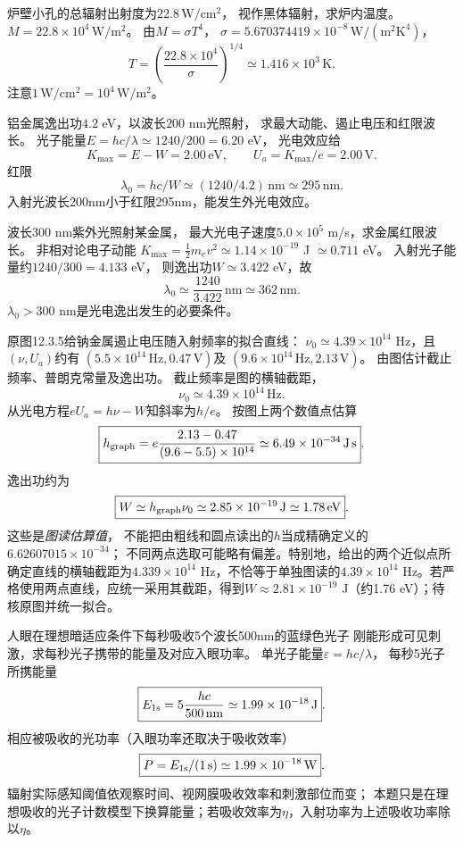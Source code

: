 \problemtext 炉壁小孔的总辐射出射度为$22.8\,\mathrm{W/cm^2}$，
视作黑体辐射，求炉内温度。
\workings
$M=22.8\times10^4\,\mathrm{W/m^2}$。
由$M=\sigma T^4$，
$\sigma=5.670374419\times10^{-8}\,\mathrm{W/(m^2K^4)}$，
\[
\boxed{T=\left(\frac{22.8\times10^4}{\sigma}\right)^{1/4}
\simeq1.416\times10^3\,\mathrm K}.
\]
\crosscheck 注意$1\,\mathrm{W/cm^2}=10^4\,\mathrm{W/m^2}$。

\problemtext 铝金属逸出功$4.2$ eV，以波长$200$ nm光照射，
求最大动能、遏止电压和红限波长。
\workings
光子能量$E=hc/\lambda\simeq1240/200=6.20$ eV，
光电效应给
\[
\boxed{K_{\max}=E-W=2.00\,\mathrm{eV}},\qquad
\boxed{U_a=K_{\max}/e=2.00\,\mathrm V}.
\]
红限
\[
\boxed{\lambda_0=hc/W\simeq(1240/4.2)\,\mathrm{nm}
\simeq295\,\mathrm{nm}}.
\]
\crosscheck 入射光波长200nm小于红限295nm，能发生外光电效应。

\problemtext 波长$300$ nm紫外光照射某金属，
最大光电子速度$5.0\times10^5$ m/s，求金属红限波长。
\workings
非相对论电子动能
$K_{\max}=\tfrac12m_ev^2\simeq1.14\times10^{-19}$ J
$\simeq0.711$ eV。
入射光子能量约$1240/300=4.133$ eV，
则逸出功$W\simeq3.422$ eV，故
\[
\boxed{\lambda_0\simeq\frac{1240}{3.422}\,\mathrm{nm}
\simeq362\,\mathrm{nm}}.
\]
\crosscheck $\lambda_0>300$ nm是光电逸出发生的必要条件。

\problemtext 原图12.3.5给钠金属遏止电压随入射频率的拟合直线：
$\nu_0\simeq4.39\times10^{14}$ Hz，且$(\nu,U_a)$约有
$(5.5\times10^{14}\,\mathrm{Hz},0.47\,\mathrm V)$及
$(9.6\times10^{14}\,\mathrm{Hz},2.13\,\mathrm V)$。
由图估计截止频率、普朗克常量及逸出功。
\workings
截止频率是图的横轴截距，
\[
\boxed{\nu_0\simeq4.39\times10^{14}\,\mathrm{Hz}}.
\]
从光电方程$eU_a=h\nu-W$知斜率为$h/e$。
按图上两个数值点估算
\[
\boxed{h_{\rm graph}
=e\frac{2.13-0.47}{(9.6-5.5)\times10^{14}}
\simeq6.49\times10^{-34}\,\mathrm{J\,s}}.
\]
逸出功约为
\[
\boxed{W\simeq h_{\rm graph}\nu_0
\simeq2.85\times10^{-19}\,\mathrm J
\simeq1.78\,\mathrm{eV}}.
\]
\crosscheck 这些是\emph{图读估算值}，
不能把由粗线和圆点读出的$h$当成精确定义的$6.62607015\times10^{-34}$；
不同两点选取可能略有偏差。特别地，给出的两个近似点所确定直线的横轴截距为$4.339\times10^{14}$ Hz，不恰等于单独图读的$4.39\times10^{14}$ Hz。若严格使用两点直线，应统一采用其截距，得到$W\approx2.81\times10^{-19}$ J（约1.76 eV）；待核原图并统一拟合。

\problemtext 人眼在理想暗适应条件下每秒吸收5个波长500nm的蓝绿色光子
刚能形成可见刺激，求每秒光子携带的能量及对应入眼功率。
\workings
单光子能量$\varepsilon=hc/\lambda$，
每秒5光子所携能量
\[
\boxed{E_{\rm 1s}=5\frac{hc}{500\,\mathrm{nm}}
\simeq1.99\times10^{-18}\,\mathrm J}.
\]
相应被吸收的光功率（入眼功率还取决于吸收效率）
\[
\boxed{P=E_{\rm 1s}/(1\,\mathrm s)
\simeq1.99\times10^{-18}\,\mathrm W}.
\]
\crosscheck 辐射实际感知阈值依观察时间、视网膜吸收效率和刺激部位而变；
本题只是在理想吸收的光子计数模型下换算能量；若吸收效率为$\eta$，入射功率为上述吸收功率除以$\eta$。

